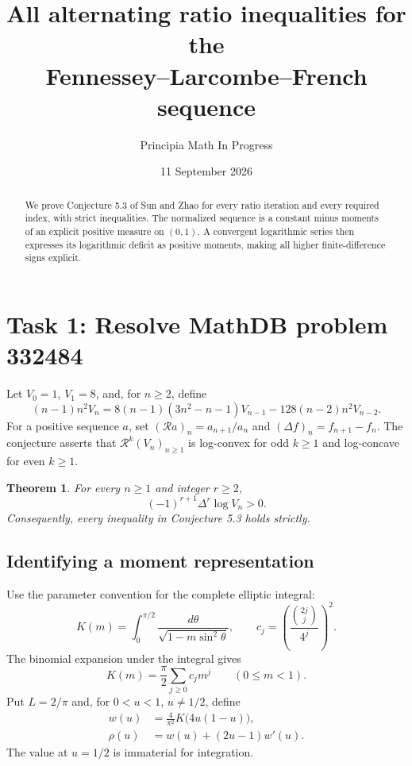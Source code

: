 \documentclass[11pt]{article}
\title{All alternating ratio inequalities for the\\
Fennessey--Larcombe--French sequence}
\author{Principia Math In Progress}
\date{11 September 2026}
\newtheorem{theorem}{Theorem}
\begin{document}
\maketitle
\begin{abstract}
We prove Conjecture 5.3 of Sun and Zhao for every ratio iteration and
every required index, with strict inequalities. The normalized sequence
is a constant minus moments of an explicit positive measure on $(0,1)$.
A convergent logarithmic series then expresses its logarithmic deficit
as positive moments, making all higher finite-difference signs explicit.
\end{abstract}

\section*{Task 1: Resolve MathDB problem 332484}
Let $V_0=1$, $V_1=8$, and, for $n\geq2$, define
\begin{equation}\label{eq:Vrec}
 (n-1)n^2V_n
 =8(n-1)(3n^2-n-1)V_{n-1}-128(n-2)n^2V_{n-2}.
\end{equation}
For a positive sequence $a$, set $(\mathcal Ra)_n=a_{n+1}/a_n$ and
$(\Delta f)_n=f_{n+1}-f_n$.
The conjecture \cite[Conjecture 5.3, p.~601]{published} asserts that
$\mathcal R^k(V_n)_{n\geq1}$ is log-convex for odd $k\geq1$ and
log-concave for even $k\geq1$.

\begin{theorem}\label{thm:main}
For every $n\geq1$ and integer $r\geq2$,
\begin{equation}\label{eq:sign}
 (-1)^{r+1}\Delta^r\log V_n>0.
\end{equation}
Consequently, every inequality in Conjecture 5.3 holds strictly.
\end{theorem}

\subsection*{Identifying a moment representation}
Use the parameter convention for the complete elliptic integral:
\[
 K(m)=\int_0^{\pi/2}\frac{d\theta}{\sqrt{1-m\sin^2\theta}},\qquad
 c_j=\left(\frac{\binom{2j}j}{4^j}\right)^2.
\]
The binomial expansion under the integral gives
\begin{equation}\label{eq:Kseries}
 K(m)=\frac\pi2\sum_{j\geq0}c_jm^j\qquad(0\leq m<1).
\end{equation}
Put $L=2/\pi$ and, for $0<u<1$, $u\ne1/2$, define
\begin{align}
 w(u)&=\frac4{\pi^2}K\bigl(4u(1-u)\bigr),\label{eq:w}\\
 \rho(u)&=w(u)+(2u-1)w'(u).
 \label{eq:rho}
\end{align}
The value at $u=1/2$ is immaterial for integration.
\end{document}
